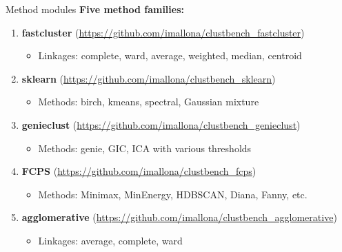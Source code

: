 \documentclass[aspectratio=169]{beamer}
\begin{document}
\begin{frame}{Method modules}
    \textbf{Five method families:}
    
    \vspace{0.3cm}
    \begin{enumerate}
        \item \textbf{fastcluster} (\url{https://github.com/imallona/clustbench_fastcluster})
            \begin{itemize}
                \item Linkages: complete, ward, average, weighted, median, centroid
            \end{itemize}
        
        \item \textbf{sklearn} (\url{https://github.com/imallona/clustbench_sklearn})
            \begin{itemize}
                \item Methods: birch, kmeans, spectral, Gaussian mixture
            \end{itemize}
        
        \item \textbf{genieclust} (\url{https://github.com/imallona/clustbench_genieclust})
            \begin{itemize}
                \item Methods: genie, GIC, ICA with various thresholds
            \end{itemize}
        
        \item \textbf{FCPS} (\url{https://github.com/imallona/clustbench_fcps})
            \begin{itemize}
                \item Methods: Minimax, MinEnergy, HDBSCAN, Diana, Fanny, etc.
            \end{itemize}
        
        \item \textbf{agglomerative} (\url{https://github.com/imallona/clustbench_agglomerative})
            \begin{itemize}
                \item Linkages: average, complete, ward
            \end{itemize}
    \end{enumerate}
\end{frame}
\end{document}
